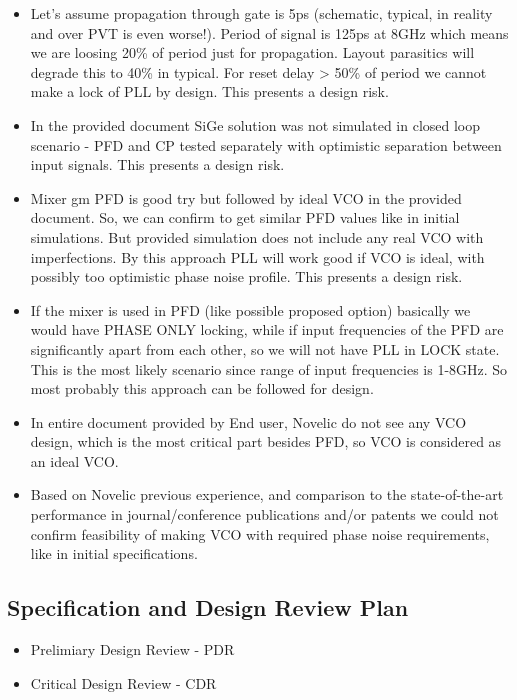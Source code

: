 \documentclass{article}
\begin{document}
\begin{itemize}
	\item Let's assume propagation through gate is 5ps (schematic, typical, in reality and over PVT is even worse!). Period of signal is 125ps at 8GHz which means we are loosing 20\% of period just for propagation. Layout parasitics will degrade this to 40\% in typical. For reset delay > 50\% of period we cannot make a lock of PLL by design. This presents a design risk.
	\item In the provided document SiGe solution was not simulated in closed loop scenario - PFD and CP tested separately with optimistic separation between input signals. This presents a design risk.
	\item Mixer gm PFD is good try but followed by ideal VCO in the provided document.  So, we can confirm to get similar PFD values like in initial simulations. But provided simulation does not include any real VCO with imperfections.  By this approach PLL will work good if VCO is ideal, with possibly too optimistic phase noise profile. This presents a design risk.
	\item If the mixer is used in PFD (like possible proposed option) basically we would have PHASE ONLY locking, while if input frequencies of the PFD are significantly apart from each other, so we will not have PLL in LOCK state. This is the most likely scenario since range of input frequencies is 1-8GHz. So most probably this approach can be followed for design.
	\item In entire document provided by End user, Novelic do not see any VCO design, which is the most critical part besides PFD, so VCO is considered as an ideal VCO.  
	\item Based on Novelic previous experience, and comparison to the state-of-the-art performance in journal/conference publications and/or patents we could not confirm feasibility of making VCO with required phase noise requirements, like in initial specifications. 

\end{itemize}

\newpage

\subsection{Specification and Design Review Plan} %

\begin{itemize}
	\item Prelimiary Design Review	- PDR
	\item Critical Design Review	- CDR
\end{itemize}
\end{document}
